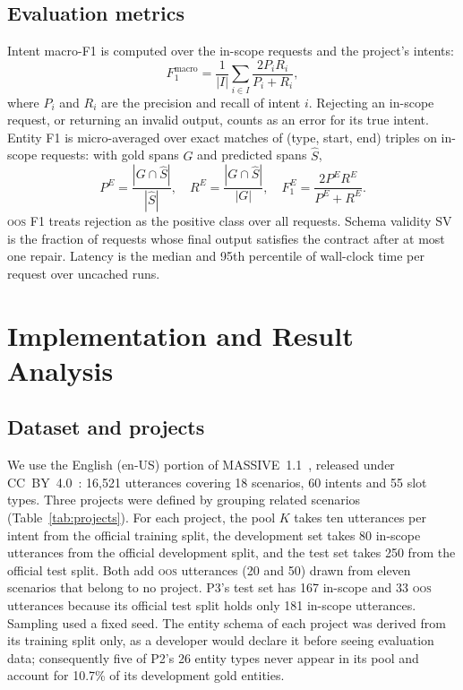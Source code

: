 \documentclass[conference]{IEEEtran}
\newcommand{\oos}{\textsc{oos}}
\begin{document}
\subsection{Evaluation metrics}
\label{sec:metrics}

Intent macro-F1 is computed over the in-scope requests and the project's intents:
\begin{equation}
F_1^{\text{macro}}=\frac{1}{|I|}\sum_{i\in I}\frac{2P_iR_i}{P_i+R_i},
\end{equation}
where $P_i$ and $R_i$ are the precision and recall of intent $i$. Rejecting an in-scope request, or returning an invalid output, counts as an error for its true intent. Entity F1 is micro-averaged over exact matches of (type, start, end) triples on in-scope requests: with gold spans $G$ and predicted spans $\hat{S}$,
\begin{equation}
P^{E}=\frac{|G\cap\hat{S}|}{|\hat{S}|},\quad R^{E}=\frac{|G\cap\hat{S}|}{|G|},\quad F_1^{E}=\frac{2P^{E}R^{E}}{P^{E}+R^{E}}.
\end{equation}
\oos{} F1 treats rejection as the positive class over all requests. Schema validity $\mathrm{SV}$ is the fraction of requests whose final output satisfies the contract after at most one repair. Latency is the median and 95th percentile of wall-clock time per request over uncached runs.

\section{Implementation and Result Analysis}
\label{sec:results}

\subsection{Dataset and projects}

We use the English (en-US) portion of MASSIVE~1.1~\cite{fitzgerald2023massive}, released under CC~BY~4.0~\cite{massive2022repo}: 16{,}521 utterances covering 18 scenarios, 60 intents and 55 slot types. Three projects were defined by grouping related scenarios (Table~\ref{tab:projects}). For each project, the pool $K$ takes ten utterances per intent from the official training split, the development set takes 80 in-scope utterances from the official development split, and the test set takes 250 from the official test split. Both add \oos{} utterances (20 and 50) drawn from eleven scenarios that belong to no project. P3's test set has 167 in-scope and 33 \oos{} utterances because its official test split holds only 181 in-scope utterances. Sampling used a fixed seed. The entity schema of each project was derived from its training split only, as a developer would declare it before seeing evaluation data; consequently five of P2's 26 entity types never appear in its pool and account for 10.7\% of its development gold entities.
\end{document}
